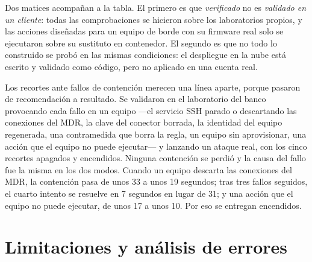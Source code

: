 Dos matices acompañan a la tabla. El primero es que \emph{verificado} no es \emph{validado en un
cliente}: todas las comprobaciones se hicieron sobre los laboratorios propios, y las acciones
diseñadas para un equipo de borde con su firmware real solo se ejecutaron sobre su sustituto en
contenedor. El segundo es que no todo lo construido se probó en las mismas condiciones: el
despliegue en la nube está escrito y validado como código, pero no aplicado en una cuenta real.

Los recortes ante fallos de contención merecen una línea aparte, porque pasaron de recomendación a
resultado. Se validaron en el laboratorio del banco provocando cada fallo en un equipo ---el servicio
SSH parado o descartando las conexiones del MDR, la clave del conector borrada, la identidad del
equipo regenerada, una contramedida que borra la regla, un equipo sin aprovisionar, una acción que
el equipo no puede ejecutar--- y lanzando un ataque real, con los cinco recortes apagados y
encendidos. Ninguna contención se perdió y la causa del fallo fue la misma en los dos modos. Cuando
un equipo descarta las conexiones del MDR, la contención pasa de unos 33 a unos 19 segundos; tras
tres fallos seguidos, el cuarto intento se resuelve en 7 segundos en lugar de 31; y una acción que
el equipo no puede ejecutar, de unos 17 a unos 10. Por eso se entregan encendidos.

\section{Limitaciones y análisis de errores}


